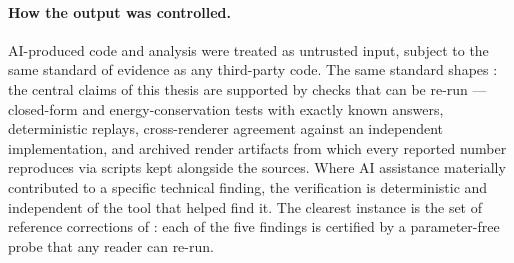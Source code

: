 \paragraph{How the output was controlled.} AI-produced code and analysis were treated as
untrusted input, subject to the same standard of evidence as any third-party code. The same
standard shapes : the central claims of this thesis are supported by
checks that can be re-run ---
closed-form and energy-conservation tests with exactly known answers, deterministic
replays, cross-renderer agreement against an independent implementation, and archived render
artifacts from which every reported number reproduces via scripts kept alongside the
sources. Where AI assistance materially contributed to a specific technical finding, the
verification is deterministic and independent of the tool that helped find it. The clearest
instance is the set of reference corrections of : each of the
five findings is certified by a parameter-free probe that any reader can re-run.
